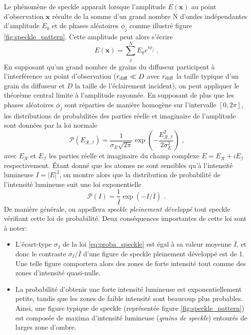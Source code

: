 Le phénomène de speckle apparaît lorsque l'amplitude $E(\mathbf{x})$ au point d'observation $\mathbf{x}$ résulte de la somme d'un grand nombre N d'ondes indépendantes d'amplitude $E_0$ et de phases aléatoires $\phi_j$ comme illustré figure \ref{fig:speckle_pattern}. Cette amplitude peut alors s'écrire
\begin{equation}
E(\mathbf{x})=\sum_{j}^{N} E_0 e^{i \phi_j} \text{ .}
\end{equation}
En supposant qu'un grand nombre de grains du diffuseur participent à l'interférence au point d'observation ($r_{\mathrm{diff}} \ll D$ avec $r_{\mathrm{diff}}$ la taille typique d'un grain du diffuseur et $D$ la taille de l'éclairement incident), on peut appliquer le théorème central limite à l'amplitude rayonnée. En supposant de plus que les phases aléatoires $\phi_j$ sont réparties de manière homogène sur l'intervalle $\left[ 0,2\pi \right]$, les distributions de probabilités des parties réelle et imaginaire de l'amplitude sont données par la loi normale
\begin{equation}
\mathcal{P}(E_{\mathcal{R,I}})=\frac{1}{\sigma_E\sqrt{2\pi}} \exp{\left( -\frac{E_{\mathcal{R,I}}^2}{2 \sigma_E^2}\right) } \text{ ,}
\end{equation}
avec $E_{\mathcal{R}}$ et $E_{\mathcal{I}}$ les parties réelle et imaginaire du champ complexe $E=E_{\mathcal{R}} +i E_{\mathcal{I}}$ respectivement. Étant donné que les atomes ne sont sensibles qu'à l'intensité lumineuse $I=\left| E \right| ^2$, on montre alors que la distribution de probabilité de l'intensité lumineuse suit une loi exponentielle \citep{goodman2007speckle}
\begin{equation}
\mathcal{P}(I)=\frac{1}{\overline{I}}\exp{\left( -I/\overline{I} \right) } \text{ .}
\label{eq:proba_speckle}
\end{equation}
De manière générale, on appellera \emph{speckle pleinement développé} tout speckle vérifiant cette loi de probabilité. Deux conséquences importantes de cette loi sont à noter:
\begin{itemize}
\item[\textendash] L'écart-type $\sigma_I$ de la loi \ref{eq:proba_speckle} est égal à sa valeur moyenne $\overline{I}$, et donc le contraste $\sigma_I /\overline{I}$ d'une figure de speckle pleinement développé est de 1. Une telle figure comportera alors des zones de forte intensité tout comme des zones d'intensité quasi-nulle. 
\item[\textendash] La probabilité d'obtenir une forte intensité lumineuse est exponentiellement petite, tandis que les zones de faible intensité sont beaucoup plus probables. Ainsi, une figure typique de speckle (représentée figure \ref{fig:speckle_pattern}) est composée de maxima d'intensité lumineuse (\emph{grains de speckle}) entourés de larges zone d'ombre.
\end{itemize}





